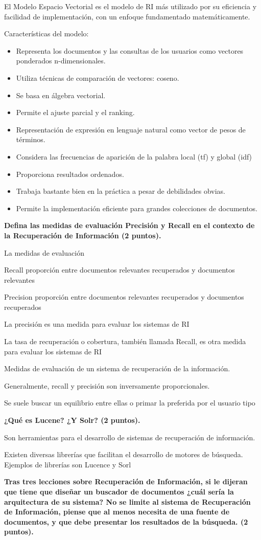\documentclass[11pt]{exam}
\begin{document}
\begin{questions}
El Modelo Espacio Vectorial es el modelo de RI más utilizado por su eficiencia y facilidad de implementación, con un enfoque fundamentado matemáticamente.

Características del modelo:

\begin{itemize}
	\item Representa los documentos y las consultas de los usuarios como vectores ponderados n-dimensionales.
	\item Utiliza técnicas de comparación de vectores: coseno.
	\item Se basa en álgebra vectorial.
	\item Permite el ajuste parcial y el ranking.
	\item Representación de expresión en lenguaje natural como vector de pesos de términos.
	\item Considera las frecuencias de aparición de la palabra local (tf) y global (idf)
	\item Proporciona resultados ordenados.
	\item Trabaja bastante bien en la práctica a pesar de debilidades obvias.
	\item Permite la implementación eficiente para grandes colecciones de documentos.
\end{itemize}


{\bf \question Defina las medidas de evaluación Precisión y Recall en el contexto de la Recuperación de Información (2 puntos).}

La medidas de evaluación

Recall proporción entre documentos relevantes recuperados y documentos relevantes

Precision proporción entre documentos relevantes recuperados y documentos recuperados

La precisión es una medida para evaluar los sistemas de RI

La tasa de recuperación o cobertura, también llamada Recall, es otra medida para evaluar los sistemas de RI

Medidas de evaluación de un sistema de recuperación de la información.

Generalmente, recall y precisión son inversamente proporcionales.

Se suele buscar un equilibrio entre ellas o primar la preferida por el usuario tipo

{\bf \question ¿Qué es Lucene? ¿Y Solr? (2 puntos).}

Son herramientas para el desarrollo de sistemas de recuperación de información.

Existen diversas librerías que facilitan el desarrollo de motores de búsqueda. Ejemplos de librerías son Lucence y Sorl

{\bf \question Tras tres lecciones sobre Recuperación de Información, si le dijeran que tiene que diseñar un buscador de documentos ¿cuál sería la arquitectura de su sistema? No se limite al sistema de Recuperación de Información, piense que al menos necesita de una fuente de documentos, y que debe presentar los resultados de la búsqueda. (2 puntos).}

\end{questions}
	
\end{document}
